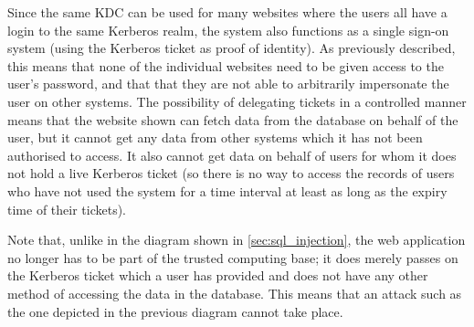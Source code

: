 \documentclass{report}
\begin{document}
Since the same KDC can be used for many websites where the users all have a login to the same Kerberos realm, the system also functions as a single sign-on system (using the Kerberos ticket as proof of identity). As previously described, this means that none of the individual websites need to be given access to the user's password, and that that they are not able to arbitrarily impersonate the user on other systems. The possibility of delegating tickets in a controlled manner means that the website shown can fetch data from the database on behalf of the user, but it cannot get any data from other systems which it has not been authorised to access. It also cannot get data on behalf of users for whom it does not hold a live Kerberos ticket (so there is no way to access the records of users who have not used the system for a time interval at least as long as the expiry time of their tickets).

\begin{center}
\end{center}

Note that, unlike in the diagram shown in \autoref{sec:sql_injection}, the web application no longer has to be part of the trusted computing base; it does merely passes on the Kerberos ticket which a user has provided and does not have any other method of accessing the data in the database. This means that an attack such as the one depicted in the previous diagram cannot take place.
\end{document}
